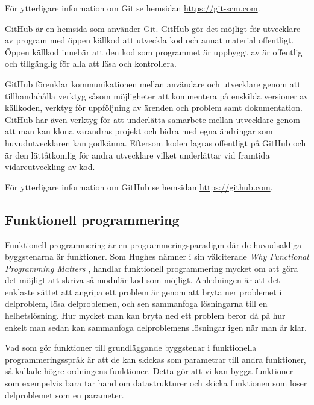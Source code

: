 \documentclass[12pt,a4paper,twoside,openright]{article}
\begin{document}
För ytterligare information om Git se hemsidan \url{https://git-scm.com}.

GitHub är en hemsida som använder Git. GitHub gör det möjligt för
utvecklare av program med öppen källkod att utveckla kod och annat
material offentligt. Öppen källkod innebär att den kod som programmet
är uppbyggt av är offentlig och tillgänglig för alla att läsa och
kontrollera.

GitHub förenklar kommunikationen mellan användare och utvecklare 
genom att tillhandahålla verktyg såsom möjligheter att kommentera
på enskilda versioner av källkoden, verktyg för uppföljning av ärenden
och problem samt dokumentation. GitHub har även verktyg för att
underlätta samarbete mellan utvecklare genom att man kan klona
varandras projekt och bidra med egna ändringar som huvudutvecklaren
kan godkänna. Eftersom koden lagras offentligt på GitHub och är den
lättåtkomlig för andra utvecklare vilket underlättar vid framtida vidareutveckling av kod.

För ytterligare information om GitHub se hemsidan \url{https://github.com}.

\subsection{Funktionell programmering}
Funktionell programmering är en programmeringsparadigm där de
huvudsakliga byggstenarna är funktioner. Som Hughes nämner i sin
välciterade \textit{Why Functional Programming Matters}
\cite{hughes1989functional}, handlar funktionell programmering mycket
om att göra det möjligt att skriva så modulär kod som möjligt.
Anledningen är att det enklaste sättet att angripa ett
problem är genom att bryta ner problemet i delproblem, lösa
delproblemen, och sen sammanfoga lösningarna till en helhetslösning.
Hur mycket man kan bryta ned ett problem beror då på hur enkelt man
sedan kan sammanfoga delproblemens lösningar igen när man är klar.

Vad som gör funktioner till grundläggande byggstenar i funktionella
programmeringsspråk är att de kan skickas som parametrar till andra
funktioner, så kallade högre ordningens funktioner. Detta gör att vi
kan bygga funktioner som exempelvis bara tar hand om datastrukturer
och skicka funktionen som löser delproblemet som en parameter.
\end{document}
